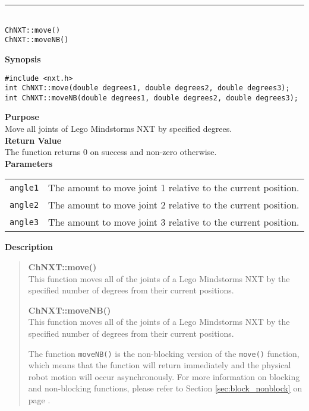 \noindent
\vspace{5pt}
\rule{4.5in}{0.015in}\\
\noindent
{\LARGE \texttt{ChNXT::move()} }\\
{\LARGE \texttt{ChNXT::moveNB()} }\\


\noindent
{\bf Synopsis}
\vspace{-8pt}
\begin{verbatim}
#include <nxt.h>
int ChNXT::move(double degrees1, double degrees2, double degrees3);
int ChNXT::moveNB(double degrees1, double degrees2, double degrees3);
\end{verbatim}

\noindent
{\bf Purpose}\\
Move all joints of Lego Mindstorms NXT by specified degrees.\\

\noindent
{\bf Return Value}\\
The function returns 0 on success and non-zero otherwise.\\

\noindent
{\bf Parameters}\\
\vspace{-0.1in}
\begin{description}
\item               
\begin{tabular}{p{15 mm}p{125 mm}}
\texttt{angle1} & The amount to move joint 1 relative to the current position. \\
\texttt{angle2} & The amount to move joint 2 relative to the current position. \\
\texttt{angle3} & The amount to move joint 3 relative to the current position. \\
\end{tabular}
\end{description}

\noindent
{\bf Description}\\
\vspace{-12pt}
\begin{quote}
{\bf ChNXT::move()}\\
This function moves all of the joints of a Lego Mindstorms NXT by 
the specified number of degrees from their current positions. 

\noindent
{\bf ChNXT::moveNB()}\\
This function moves all of the joints of a Lego Mindstorms NXT by 
the specified number of degrees from their current positions. 

The function \texttt{moveNB()} is the non-blocking version of the 
\texttt{move()} function, which means that the function will 
return immediately and the physical robot motion will occur 
asynchronously. For more information on blocking and non-blocking 
functions, please refer to Section \ref{sec:block_nonblock} on page 
\pageref{sec:block_nonblock}.\\
\end{quote}

